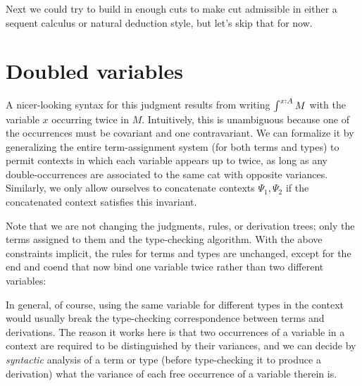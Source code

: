 \documentclass{amsart}
\let\types\vdash %
\def\p{^+} %
\def\m{^-}
\def\type{\;\mathsf{type}}
\newcommand\combine{,}
\newcommand{\coend}{\begingroup\textstyle\int\endgroup}
\newcommand{\End}{\begingroup\textstyle\int\endgroup}
\theoremstyle{definition}
\begin{document}
Next we could try to build in enough cuts to make cut admissible in either a sequent calculus or natural deduction style, but let's skip that for now.

\section{Doubled variables}
\label{sec:doubled-var}

A nicer-looking syntax for this judgment results from writing $\coend^{x:A} M$ with the variable $x$ occurring twice in $M$.
Intuitively, this is unambiguous because one of the occurrences must be covariant and one contravariant.
We can formalize it by generalizing the entire term-assignment system (for both terms and types) to permit contexts in which each variable appears up to twice, as long as any double-occurrences are associated to the same cat with opposite variances.
Similarly, we only allow ourselves to concatenate contexts $\Psi_1\combine \Psi_2$ if the concatenated context satisfies this invariant.

Note that we are not changing the judgments, rules, or derivation trees; only the terms assigned to them and the type-checking algorithm.
With the above constraints implicit, the rules for terms and types are unchanged, except for the end and coend that now bind one variable twice rather than two different variables:
In general, of course, using the same variable for different types in the context would usually break the type-checking correspondence between terms and derivations.
The reason it works here is that two occurrences of a variable in a context are required to be distinguished by their variances, and we can decide by \emph{syntactic} analysis of a term or type (before type-checking it to produce a derivation) what the variance of each free occurrence of a variable therein is.
\end{document}
